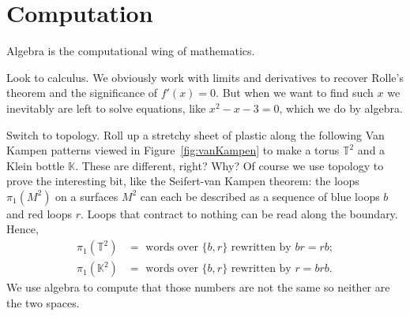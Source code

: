 \section{Computation}
Algebra is the computational wing of mathematics.  

Look to calculus.
We obviously work with limits and derivatives to recover Rolle's theorem 
and the significance of $f'(x)=0$.  But when we want to find such $x$ we
inevitably are left to solve equations, like $x^2-x-3=0$, which we do by algebra.  

Switch to topology.   Roll up a stretchy sheet of plastic along the following 
Van Kampen patterns  viewed in Figure~\ref{fig:vanKampen} to make a torus $\mathbb{T}^2$ 
and a Klein bottle $\mathbb{K}$.  These are different, right?  Why?  Of course we use topology 
to prove the interesting bit, like the Seifert-van Kampen theorem: the loops 
$\pi_1(M^2)$ on a surfaces $M^2$ can each be described as a sequence of blue loops $b$ and red loops $r$.
Loops that contract to nothing can be read along the boundary.  Hence,
\begin{align*}
    \pi_1(\mathbb{T}^2) &= \text{ words over }\{b,r\} \text{ rewritten by }br=rb;
    \\
    \pi_1(\mathbb{K}^2) &= \text{ words over }\{b,r\} \text{ rewritten by } r=brb. 
\end{align*}
We use algebra to compute that those numbers are not the same so neither are the two spaces.

